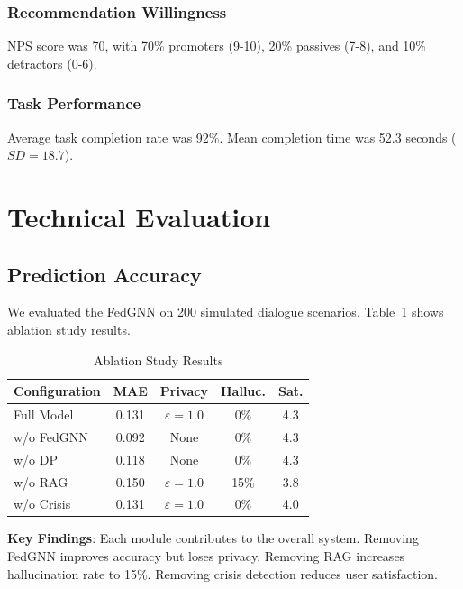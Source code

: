 \documentclass[preprint,12pt]{elsarticle}
\begin{document}
\subsubsection{Recommendation Willingness}
NPS score was 70, with 70\% promoters (9-10), 20\% passives (7-8), and 10\%
detractors (0-6).

\subsubsection{Task Performance}
Average task completion rate was 92\%. Mean completion time was 52.3 seconds ($SD=18.7$).

\section{Technical Evaluation}

\subsection{Prediction Accuracy}

We evaluated the FedGNN on 200 simulated dialogue scenarios. Table~\ref{tab:ablation}
shows ablation study results.

\begin{table}[h]
\centering
\caption{Ablation Study Results}
\label{tab:ablation}
\begin{tabular}{lcccc}
\toprule
Configuration & MAE & Privacy & Halluc. & Sat. \\
\midrule
Full Model & 0.131 & $\varepsilon=1.0$ & 0\% & 4.3 \\
w/o FedGNN & 0.092 & None & 0\% & 4.3 \\
w/o DP & 0.118 & None & 0\% & 4.3 \\
w/o RAG & 0.150 & $\varepsilon=1.0$ & 15\% & 3.8 \\
w/o Crisis & 0.131 & $\varepsilon=1.0$ & 0\% & 4.0 \\
\bottomrule
\end{tabular}
\end{table}

\textbf{Key Findings}: Each module contributes to the overall system. Removing FedGNN
improves accuracy but loses privacy. Removing RAG increases hallucination rate to 15\%.
Removing crisis detection reduces user satisfaction.
\end{document}
